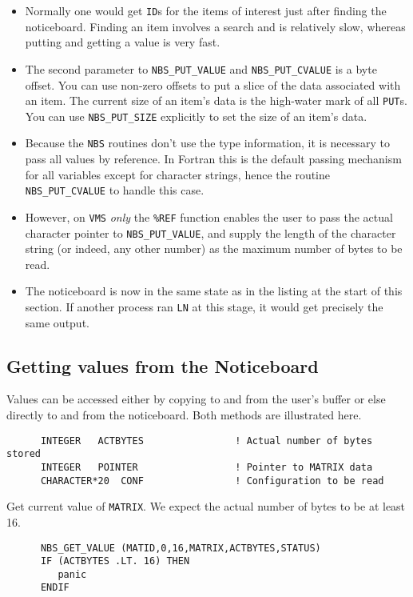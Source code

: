 \begin {itemize}
\item Normally one would get {\tt ID}s for the items of interest just after
finding the noticeboard. Finding an item involves a search and is relatively
slow, whereas putting and getting a value is very fast.
\item The second parameter to {\tt NBS\_PUT\_VALUE} and {\tt NBS\_PUT\_CVALUE} 
is a byte offset. You
can use non-zero offsets to put a slice of the data associated with an item.
The current size of an item's data is the high-water mark of all {\tt PUT}s.
You can use {\tt NBS\_PUT\_SIZE} explicitly to set the size of an item's data.
\item Because the {\tt NBS} routines don't use the type information, it is
necessary to pass all values by reference. In Fortran this is the default
passing mechanism for all variables except for character strings, hence the 
routine {\tt NBS\_PUT\_CVALUE} to handle this case.
\item However, on {\tt VMS} {\em only} the {\tt \%REF} function enables the 
user to pass the actual character pointer to {\tt NBS\_PUT\_VALUE}, and supply
the length of the character string (or indeed, any other number) as the 
maximum number of bytes to be read.
\item The noticeboard is now in the same state as in the listing at the start
of this section. If another process ran {\tt LN} at this stage, it would get
precisely the same output.
\end {itemize}

\subsection {Getting values from the Noticeboard}

Values can be accessed either by copying to and from the user's buffer or else
directly to and from the noticeboard. Both methods are illustrated here.

\begin {verbatim}
      INTEGER   ACTBYTES                ! Actual number of bytes stored
      INTEGER   POINTER                 ! Pointer to MATRIX data
      CHARACTER*20  CONF                ! Configuration to be read
\end{verbatim}

Get current value of {\tt MATRIX}. We expect the actual number of bytes to
be at least 16.

\begin {verbatim}
      NBS_GET_VALUE (MATID,0,16,MATRIX,ACTBYTES,STATUS)
      IF (ACTBYTES .LT. 16) THEN
         panic
      ENDIF
\end{verbatim}

